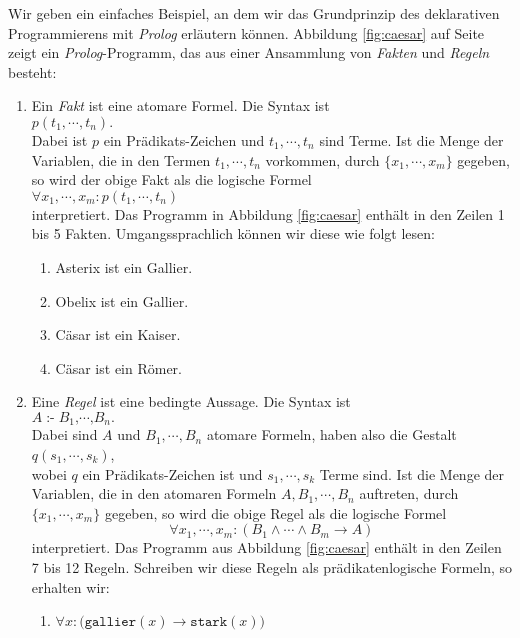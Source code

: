 Wir geben ein einfaches Beispiel, an dem wir das Grundprinzip des deklarativen
Programmierens mit \textsl{Prolog} erl\"{a}utern k\"{o}nnen.  Abbildung \ref{fig:caesar} auf Seite
\pageref{fig:caesar} zeigt ein \textsl{Prolog}-Programm, das aus einer Ansammlung von
\textsl{Fakten} und \textsl{Regeln} besteht:
\begin{enumerate}
\item Ein \emph{Fakt} ist eine atomare Formel.  Die Syntax ist\\[0.2cm]
      \hspace*{1.3cm} $p(t_1,\cdots,t_n).$ \\[0.2cm]
      Dabei ist $p$ ein Pr\"{a}dikats-Zeichen und $t_1, \cdots,t_n$ sind Terme.
      Ist die Menge der Variablen, die in den Termen $t_1,\cdots,t_n$ vorkommen,
      durch $\{x_1,\cdots,x_m\}$ gegeben, so wird der obige Fakt als die 
      logische Formel \\[0.2cm]
      \hspace*{1.3cm} $\forall x_1, \cdots, x_m \colon p(t_1,\cdots,t_n)$ \\[0.2cm]
      interpretiert.  Das Programm in Abbildung \ref{fig:caesar} enth\"{a}lt in den Zeilen
      1 bis 5 Fakten.  Umgangssprachlich k\"{o}nnen wir diese wie folgt lesen:
      \begin{enumerate}
      \item Asterix ist ein Gallier.
      \item Obelix ist ein Gallier.
      \item C\"{a}sar ist ein Kaiser.
      \item C\"{a}sar ist ein R\"{o}mer.
      \end{enumerate}
\item Eine \emph{Regel} ist eine bedingte Aussage.  Die Syntax ist \\[0.2cm]
      \hspace*{1.3cm} 
      $A \;\texttt{:-}\; B_1\texttt{,} \cdots\texttt{,} B_n\texttt{.}$ 
      \\[0.2cm]
      Dabei sind $A$ und $B_1, \cdots, B_n$ atomare Formeln, haben also die Gestalt \\[0.2cm]
      \hspace*{1.3cm} $q(s_1,\cdots,s_k)$,\\[0.2cm]
      wobei $q$ ein Pr\"{a}dikats-Zeichen ist und $s_1, \cdots, s_k$ Terme sind.
      Ist die Menge der Variablen, die in den atomaren Formeln $A,B_1,\cdots,B_n$
      auftreten, durch $\{x_1, \cdots, x_m\}$ gegeben, so wird die obige Regel als die 
      logische Formel       
      \[ \forall x_1, \cdots, x_m : (B_1 \wedge \cdots \wedge B_m \rightarrow A) \]
      interpretiert.  Das Programm aus Abbildung \ref{fig:caesar} enth\"{a}lt in den Zeilen
      7 bis 12 Regeln.  Schreiben wir diese Regeln als pr\"{a}dikatenlogische Formeln,
      so erhalten wir:
      \begin{enumerate}
      \item $\forall x : \bigl(\texttt{gallier}(x) \rightarrow \texttt{stark}(x)\bigr)$



\end{enumerate}
\end{enumerate}
